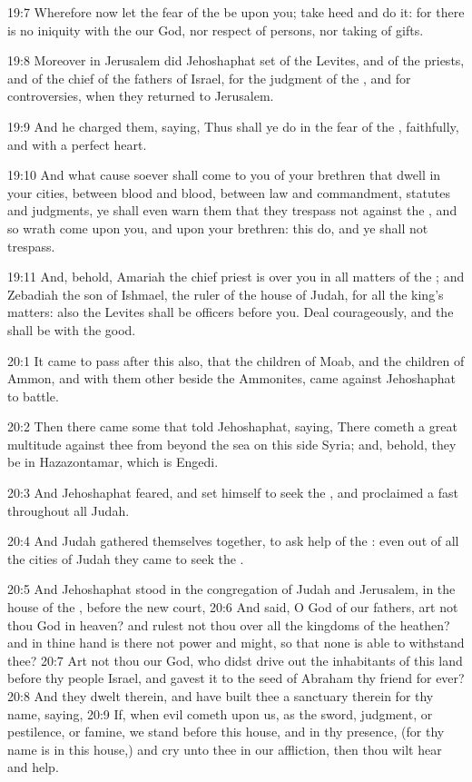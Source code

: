 19:7 Wherefore now let the fear of the \LORD be upon you; take heed and
do it: for there is no iniquity with the \LORD our God, nor respect of
persons, nor taking of gifts.

19:8 Moreover in Jerusalem did Jehoshaphat set of the Levites, and of
the priests, and of the chief of the fathers of Israel, for the
judgment of the \LORD, and for controversies, when they returned to
Jerusalem.

19:9 And he charged them, saying, Thus shall ye do in the fear of the
\LORD, faithfully, and with a perfect heart.

19:10 And what cause soever shall come to you of your brethren that
dwell in your cities, between blood and blood, between law and
commandment, statutes and judgments, ye shall even warn them that they
trespass not against the \LORD, and so wrath come upon you, and upon
your brethren: this do, and ye shall not trespass.

19:11 And, behold, Amariah the chief priest is over you in all matters
of the \LORD; and Zebadiah the son of Ishmael, the ruler of the house
of Judah, for all the king's matters: also the Levites shall be
officers before you. Deal courageously, and the \LORD shall be with the
good.

20:1 It came to pass after this also, that the children of Moab, and
the children of Ammon, and with them other beside the Ammonites, came
against Jehoshaphat to battle.

20:2 Then there came some that told Jehoshaphat, saying, There cometh
a great multitude against thee from beyond the sea on this side Syria;
and, behold, they be in Hazazontamar, which is Engedi.

20:3 And Jehoshaphat feared, and set himself to seek the \LORD, and
proclaimed a fast throughout all Judah.

20:4 And Judah gathered themselves together, to ask help of the \LORD:
even out of all the cities of Judah they came to seek the \LORD.

20:5 And Jehoshaphat stood in the congregation of Judah and Jerusalem,
in the house of the \LORD, before the new court, 20:6 And said, O \LORD
God of our fathers, art not thou God in heaven? and rulest not thou
over all the kingdoms of the heathen? and in thine hand is there not
power and might, so that none is able to withstand thee?  20:7 Art not
thou our God, who didst drive out the inhabitants of this land before
thy people Israel, and gavest it to the seed of Abraham thy friend for
ever?  20:8 And they dwelt therein, and have built thee a sanctuary
therein for thy name, saying, 20:9 If, when evil cometh upon us, as
the sword, judgment, or pestilence, or famine, we stand before this
house, and in thy presence, (for thy name is in this house,) and cry
unto thee in our affliction, then thou wilt hear and help.

